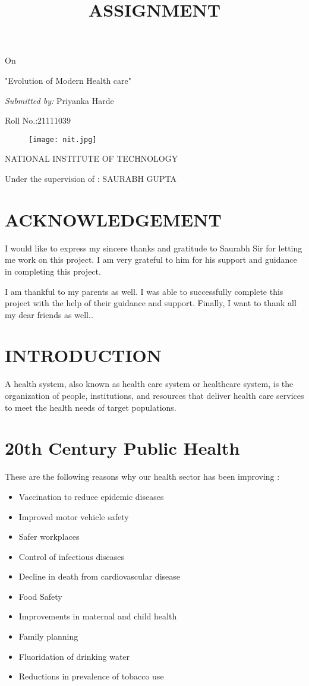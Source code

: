 \documentclass[11pt]{article}
\title{\Huge \textbf{ASSIGNMENT}}
\begin{document}
\maketitle
\centering On

\Huge "Evolution of Modern Health care"
\setlength{\parskip}{0.5em}

\emph{\large Submitted by:}
\large Priyanka Harde

\large Roll No.:21111039
\begin{figure}[h]
\begin{center}
\texttt{[image: nit.jpg]}
\end{center}
\end{figure}

\textsc{\Large NATIONAL INSTITUTE OF TECHNOLOGY}

\large Under the supervision of : SAURABH GUPTA 
\clearpage 
\tableofcontents
\clearpage
\section{\huge  ACKNOWLEDGEMENT}
\Large \raggedright I would like to express my sincere thanks and gratitude to Saurabh Sir for letting me work on this project. I am very grateful to him for his support and guidance in completing this project.

I am thankful to my parents as well. I was able to successfully complete this project with the help of their guidance and support. Finally, I want to thank all my dear friends as well..

\section{\textbf{\huge INTRODUCTION}}
\raggedright \Large A health system, also known as health care system or healthcare system, is the organization of people, institutions, and resources that deliver health care services to meet the health needs of target populations.


\section{\huge 20th Century Public Health}
These are the following reasons why our health sector has been improving :
\begin{itemize}
\item \large Vaccination to reduce epidemic diseases
\item \large Improved motor vehicle safety
\item \large Safer workplaces
\item \large Control of infectious diseases
\item \large Decline in death from cardiovascular disease
\item \large Food Safety
\item \large Improvements in maternal and child health 
\item \large Family planning
\item \large Fluoridation of drinking water
\item \large  Reductions in prevalence of tobacco use
\end{itemize}
\end{document}
